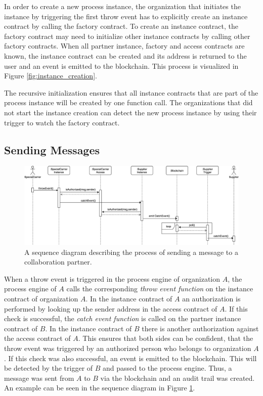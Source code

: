 \documentclass[runningheads]{llncs}
\begin{document}
In order to create a new process instance, the organization that initiates the instance by triggering the first throw event has to explicitly create an instance contract by calling the factory contract.
To create an instance contract, the factory contract may need to initialize other instance contracts by calling other factory contracts.
When all partner instance, factory and access contracts are known, the instance contract can be created and its address is returned to the user and an event is emitted to the blockchain.
This process is visualized in Figure \ref{fig:instance_creation}.

The recursive initialization ensures that all instance contracts that are part of the process instance will be created by one function call.
The organizations that did not start the instance creation can detect the new process instance by using their trigger to watch the factory contract.

\subsection{Sending Messages}
\begin{figure}
	\centering
	\includegraphics[width=\textwidth]{fig/event_sending.eps}
	\caption{A sequence diagram describing the process of sending a message to a collaboration partner.}
	\label{fig:event_sending}
\end{figure}

When a throw event is triggered in the process engine of organization $A$, the process engine of $A$ calls the corresponding \emph{throw event function} on the instance contract of organization $A$.
In the instance contract of $A$ an authorization is performed by looking up the sender address in the access contract of $A$.
If this check is successful, the \emph{catch event function} is called on the partner instance contract of $B$.
In the instance contract of $B$ there is another authorization against the access contract of $A$.
This ensures that both sides can be confident, that the throw event was triggered by an authorized person who belongs to organization $A$.
If this check was also successful, an event is emitted to the blockchain.
This will be detected by the trigger of $B$ and passed to the process engine.
Thus, a message was sent from $A$ to $B$ via the blockchain and an audit trail was created.
An example can be seen in the sequence diagram in Figure \ref{fig:event_sending}.
\end{document}
